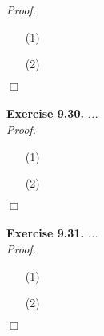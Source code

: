 \documentclass{article}
\begin{document}
\emph{Proof.}
\begin{enumerate}
\item[(1)]
\item[(2)]

\end{enumerate}
$\Box$ \\\\






\textbf{Exercise 9.30.}
\emph{...} \\

\emph{Proof.}
\begin{enumerate}
\item[(1)]
\item[(2)]

\end{enumerate}
$\Box$ \\\\






\textbf{Exercise 9.31.}
\emph{...} \\

\emph{Proof.}
\begin{enumerate}
\item[(1)]
\item[(2)]

\end{enumerate}
$\Box$ \\\\



\end{document}
